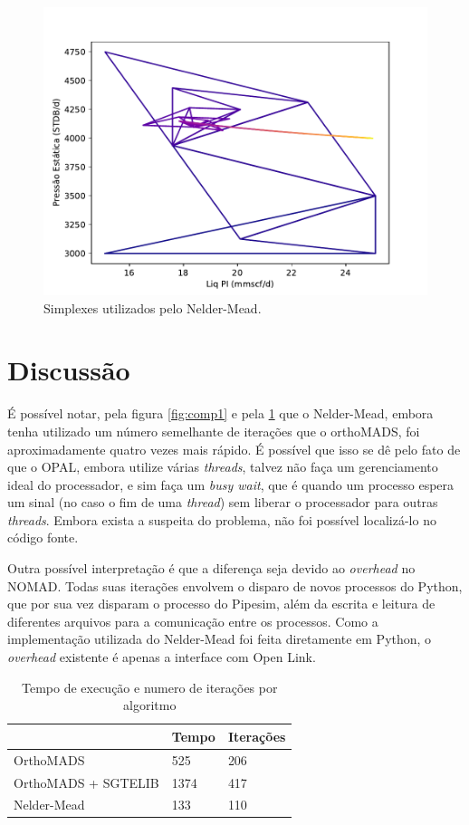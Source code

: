 \begin{figure}
\centering
	  \includegraphics[width=0.7\linewidth]{figs/triangles_neldermead.pdf}
  \caption{Simplexes utilizados pelo Nelder-Mead.}
  \label{fig:setup3_triang}
\end{figure}




\section{Discussão}

É possível notar, pela figura \ref{fig:comp1} e pela \ref{tab:res1} que o Nelder-Mead, embora tenha utilizado um número semelhante de iterações que o orthoMADS, foi aproximadamente quatro vezes mais rápido. É possível que isso se dê pelo fato de que o OPAL, embora utilize várias \textit{threads}, talvez não faça um gerenciamento ideal do processador, e sim faça um \textit{busy wait}, que é quando um processo espera um sinal (no caso o fim de uma \textit{thread}) sem liberar o processador para outras \textit{threads}. Embora exista a suspeita do problema, não foi possível localizá-lo no código fonte.

Outra possível interpretação é que a diferença seja devido ao \textit{overhead} no NOMAD. Todas suas iterações envolvem o disparo de novos processos do Python, que por sua vez disparam o processo do Pipesim, além da escrita e leitura de diferentes arquivos para a comunicação entre os processos. Como a implementação utilizada do Nelder-Mead foi feita diretamente em Python, o \textit{overhead} existente é apenas a interface com Open Link.


\begin{table}[		]
\centering
\caption{Tempo de execução e numero de iterações por algoritmo}
\label{tab:res1}
\begin{tabular}{|l|l|l|}
\hline
                    & Tempo & Iterações \\ \hline
OrthoMADS           & 525   & 206       \\ \hline
OrthoMADS + SGTELIB & 1374  & 417       \\ \hline
Nelder-Mead         & 133   & 110        \\ \hline
\end{tabular}
\end{table}



